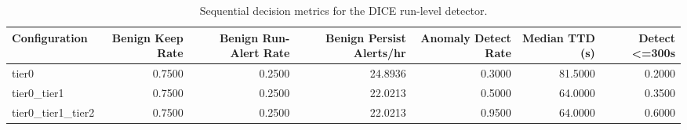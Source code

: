 \begin{table}[t]
\centering
\caption{Sequential decision metrics for the DICE run-level detector.}
\label{tab:dice_sequential_metrics}
\footnotesize
\begin{tabular}{lrrrrrr}
\toprule
Configuration & Benign Keep Rate & Benign Run-Alert Rate & Benign Persist Alerts/hr & Anomaly Detect Rate & Median TTD (s) & Detect <=300s \\
\midrule
tier0 & 0.7500 & 0.2500 & 24.8936 & 0.3000 & 81.5000 & 0.2000 \\
tier0_tier1 & 0.7500 & 0.2500 & 22.0213 & 0.5000 & 64.0000 & 0.3500 \\
tier0_tier1_tier2 & 0.7500 & 0.2500 & 22.0213 & 0.9500 & 64.0000 & 0.6000 \\
\bottomrule
\end{tabular}

\end{table}

